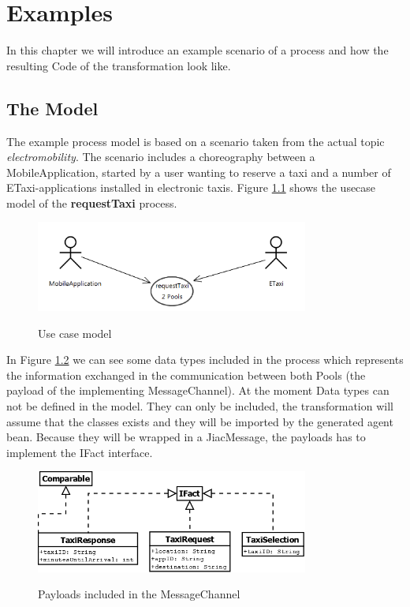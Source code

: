 \chapter{Examples}
\label{chap:examples}

In this chapter we will introduce an example scenario of a process and how the resulting Code of the transformation look like.

\section{The Model}
The example process model is based on a scenario taken from the actual topic \textit{electromobility}. The scenario includes a choreography between a MobileApplication, started by a user wanting to reserve a taxi and a number of ETaxi-applications installed in electronic taxis. Figure \ref{fig:usecase} shows the usecase model of the \textbf{requestTaxi} process. 
\begin{figure}[h]
	\centering
		\includegraphics[width=0.8\textwidth]{images/example/usecase.png}
	\label{fig:usecase}
	\caption{Use case model}
\end{figure}

In Figure \ref{fig:payloads} we can see some data types included in the process which represents the information exchanged in the communication between both Pools (the payload of the implementing MessageChannel). At the moment Data types can not be defined in the model. They can only be included, the transformation will assume that the classes exists and they will be imported by the generated agent bean. Because they will be wrapped in a JiacMessage, the payloads has to implement the IFact interface.
\begin{figure}[h]
	\centering
		\includegraphics[width=0.8\textwidth]{images/example/payloads.png}
	\label{fig:payloads}
	\caption{Payloads included in the MessageChannel}
\end{figure}

